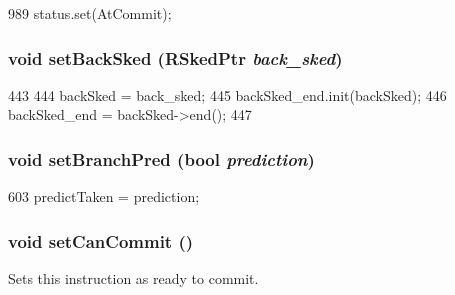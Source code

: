 \begin{DoxyCode}
989 { status.set(AtCommit); }
\end{DoxyCode}
\hypertarget{classInOrderDynInst_a46d964285ae05aeb9ea40f8bd0646a10}{
\subsubsection[{setBackSked}]{\setlength{\rightskip}{0pt plus 5cm}void setBackSked ({\bf RSkedPtr} {\em back\_\-sked})}}
\label{classInOrderDynInst_a46d964285ae05aeb9ea40f8bd0646a10}



\begin{DoxyCode}
443     {
444         backSked = back_sked;
445         backSked_end.init(backSked);
446         backSked_end = backSked->end();
447     }
\end{DoxyCode}
\hypertarget{classInOrderDynInst_a927efab2b8bc73bafd4b17592f115a09}{
\subsubsection[{setBranchPred}]{\setlength{\rightskip}{0pt plus 5cm}void setBranchPred (bool {\em prediction})}}
\label{classInOrderDynInst_a927efab2b8bc73bafd4b17592f115a09}



\begin{DoxyCode}
603 { predictTaken = prediction; }
\end{DoxyCode}
\hypertarget{classInOrderDynInst_a0cbc886f9978503b587b4d7a7e3db728}{
\subsubsection[{setCanCommit}]{\setlength{\rightskip}{0pt plus 5cm}void setCanCommit ()}}
\label{classInOrderDynInst_a0cbc886f9978503b587b4d7a7e3db728}
Sets this instruction as ready to commit. 


